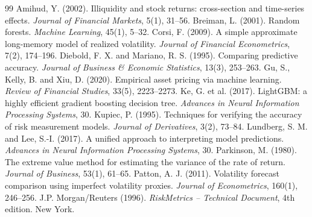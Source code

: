 \documentclass[11pt,a4paper]{article}
\begin{document}

\begin{thebibliography}{99}
 Amihud, Y. (2002). Illiquidity and stock returns: cross-section and time-series effects. \textit{Journal of Financial Markets}, 5(1), 31--56.
 Breiman, L. (2001). Random forests. \textit{Machine Learning}, 45(1), 5--32.
 Corsi, F. (2009). A simple approximate long-memory model of realized volatility. \textit{Journal of Financial Econometrics}, 7(2), 174--196.
 Diebold, F. X. and Mariano, R. S. (1995). Comparing predictive accuracy. \textit{Journal of Business \& Economic Statistics}, 13(3), 253--263.
 Gu, S., Kelly, B. and Xiu, D. (2020). Empirical asset pricing via machine learning. \textit{Review of Financial Studies}, 33(5), 2223--2273.
 Ke, G. et al. (2017). LightGBM: a highly efficient gradient boosting decision tree. \textit{Advances in Neural Information Processing Systems}, 30.
 Kupiec, P. (1995). Techniques for verifying the accuracy of risk measurement models. \textit{Journal of Derivatives}, 3(2), 73--84.
 Lundberg, S. M. and Lee, S.-I. (2017). A unified approach to interpreting model predictions. \textit{Advances in Neural Information Processing Systems}, 30.
 Parkinson, M. (1980). The extreme value method for estimating the variance of the rate of return. \textit{Journal of Business}, 53(1), 61--65.
 Patton, A. J. (2011). Volatility forecast comparison using imperfect volatility proxies. \textit{Journal of Econometrics}, 160(1), 246--256.
 J.P. Morgan/Reuters (1996). \textit{RiskMetrics -- Technical Document}, 4th edition. New York.
\end{thebibliography}
\end{document}
